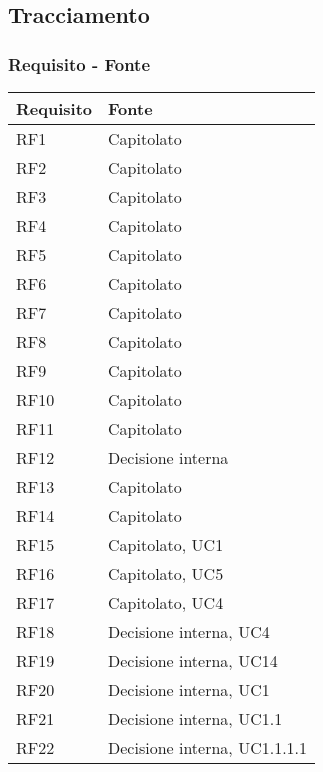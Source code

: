 \subsection{Tracciamento}

\subsubsection{Requisito - Fonte}

\begin{center}
    \begin{longtable}{|C{5cm}|C{5cm}|}
        \hline
        \textbf{Requisito} & \textbf{Fonte} \\
        \hline
        RF1 & Capitolato\\
        \hline
        RF2 & Capitolato\\
        \hline
        RF3 & Capitolato\\
        \hline
        RF4 & Capitolato\\
        \hline
        RF5 & Capitolato \\
        \hline
        RF6 & Capitolato \\
        \hline
        RF7 & Capitolato \\
        \hline
        RF8 & Capitolato \\
        \hline
        RF9 & Capitolato \\
        \hline
        RF10 & Capitolato \\
        \hline
        RF11 & Capitolato \\
        \hline
        RF12 & Decisione interna \\
        \hline
        RF13 & Capitolato \\
        \hline
        RF14 & Capitolato \\
        \hline
        RF15 & Capitolato, UC1 \\
        \hline
        RF16 & Capitolato, UC5 \\
        \hline
        RF17 & Capitolato, UC4 \\
        \hline
        RF18 & Decisione interna, UC4 \\
        \hline
        RF19 & Decisione interna, UC14 \\
        \hline
        RF20 & Decisione interna, UC1 \\
        \hline
        RF21 & Decisione interna, UC1.1 \\
        \hline
        RF22 & Decisione interna, UC1.1.1.1 \\

\end{longtable}
\end{center}
